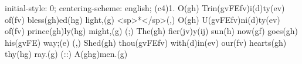initial-style: 0;
centering-scheme: english;
(c4)1. O(gh) Trin(gvFEfv)i(d)ty(ev) of(fv) bless(gh)ed(hg) light,(g) <sp>*</sp>(,)
O(gh) U(gvFEfv)ni(d)ty(ev) of(fv) prince(gh)ly(hg) might,(g) (;)
The(gh) fier(jv)y(ij) sun(h) now(gf) goes(gh) his(gvFE) way;(e) (,)
Shed(gh) thou(gvFEfv) with(d)in(ev) our(fv) hearts(gh) thy(hg) ray.(g) (::)
A(ghg)men.(g)
